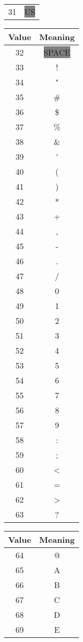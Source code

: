 \documentclass[12pt]{book}
\begin{document}
{\begin{tabular}{c c}
     31 & \colorbox{gray}{US} \\
  \end{tabular}
  \quad
  \begin{tabular}{c c}
    \hline
    Value & Meaning \\
    \hline
     32 & \colorbox{gray}{SPACE} \\
     33 & ! \\
     34 & " \\
     35 & \# \\
     36 & \$ \\
     37 & \% \\
     38 & \& \\
     39 & ' \\
     40 & ( \\
     41 & ) \\
     42 & * \\
     43 & + \\
     44 & , \\
     45 & - \\
     46 & . \\
     47 & / \\
     48 & 0 \\
     49 & 1 \\
     50 & 2 \\
     51 & 3 \\
     52 & 4 \\
     53 & 5 \\
     54 & 6 \\
     55 & 7 \\
     56 & 8 \\
     57 & 9 \\
     58 & : \\
     59 & ; \\
     60 & < \\
     61 & = \\
     62 & > \\
     63 & ? \\
  \end{tabular}
  \quad
  \begin{tabular}{c c}
    \hline
    Value & Meaning \\
    \hline
     64 & @ \\
     65 & A \\
     66 & B \\
     67 & C \\
     68 & D \\
     69 & E \\

\end{tabular}}
\end{document}
